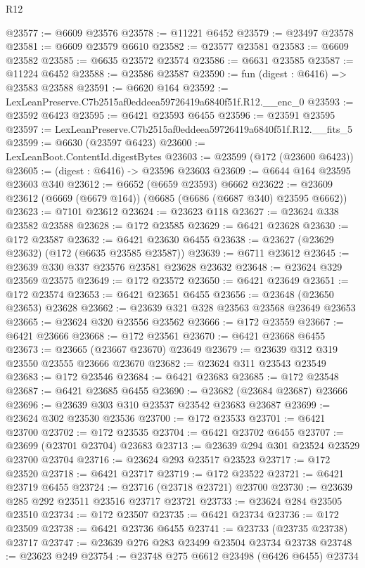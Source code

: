 \begin{lexlean}{R12}
\begin{coremodule}
@23577 := @6609 @23576
@23578 := @11221 @6452
@23579 := @23497 @23578
@23581 := @6609 @23579 @6610
@23582 := @23577 @23581
@23583 := @6609 @23582
@23585 := @6635 @23572 @23574
@23586 := @6631 @23585
@23587 := @11224 @6452
@23588 := @23586 @23587
@23590 := fun (digest : @6416) => @23583 @23588
@23591 := @6620 @164
@23592 := LexLeanPreserve.C7b2515af0eddeea59726419a6840f51f.R12.__enc_0
@23593 := @23592 @6423
@23595 := @6421 @23593 @6455
@23596 := @23591 @23595
@23597 := LexLeanPreserve.C7b2515af0eddeea59726419a6840f51f.R12.__fits_5
@23599 := @6630 (@23597 @6423)
@23600 := LexLeanBoot.ContentId.digestBytes
@23603 := @23599 (@172 (@23600 @6423))
@23605 := (digest : @6416) -> @23596 @23603
@23609 := @6644 @164 @23595 @23603 @340
@23612 := @6652 (@6659 @23593) @6662
@23622 := @23609 @23612 (@6669 (@6679 @164)) (@6685 (@6686 (@6687 @340) @23595 @6662))
@23623 := @7101 @23612
@23624 := @23623 @118
@23627 := @23624 @338 @23582 @23588
@23628 := @172 @23585
@23629 := @6421 @23628
@23630 := @172 @23587
@23632 := @6421 @23630 @6455
@23638 := @23627 (@23629 @23632) (@172 (@6635 @23585 @23587))
@23639 := @6711 @23612
@23645 := @23639 @330 @337 @23576 @23581 @23628 @23632
@23648 := @23624 @329 @23569 @23575
@23649 := @172 @23572
@23650 := @6421 @23649
@23651 := @172 @23574
@23653 := @6421 @23651 @6455
@23656 := @23648 (@23650 @23653) @23628
@23662 := @23639 @321 @328 @23563 @23568 @23649 @23653
@23665 := @23624 @320 @23556 @23562
@23666 := @172 @23559
@23667 := @6421 @23666
@23668 := @172 @23561
@23670 := @6421 @23668 @6455
@23673 := @23665 (@23667 @23670) @23649
@23679 := @23639 @312 @319 @23550 @23555 @23666 @23670
@23682 := @23624 @311 @23543 @23549
@23683 := @172 @23546
@23684 := @6421 @23683
@23685 := @172 @23548
@23687 := @6421 @23685 @6455
@23690 := @23682 (@23684 @23687) @23666
@23696 := @23639 @303 @310 @23537 @23542 @23683 @23687
@23699 := @23624 @302 @23530 @23536
@23700 := @172 @23533
@23701 := @6421 @23700
@23702 := @172 @23535
@23704 := @6421 @23702 @6455
@23707 := @23699 (@23701 @23704) @23683
@23713 := @23639 @294 @301 @23524 @23529 @23700 @23704
@23716 := @23624 @293 @23517 @23523
@23717 := @172 @23520
@23718 := @6421 @23717
@23719 := @172 @23522
@23721 := @6421 @23719 @6455
@23724 := @23716 (@23718 @23721) @23700
@23730 := @23639 @285 @292 @23511 @23516 @23717 @23721
@23733 := @23624 @284 @23505 @23510
@23734 := @172 @23507
@23735 := @6421 @23734
@23736 := @172 @23509
@23738 := @6421 @23736 @6455
@23741 := @23733 (@23735 @23738) @23717
@23747 := @23639 @276 @283 @23499 @23504 @23734 @23738
@23748 := @23623 @249
@23754 := @23748 @275 @6612 @23498 (@6426 @6455) @23734

\end{coremodule}
\end{lexlean}
